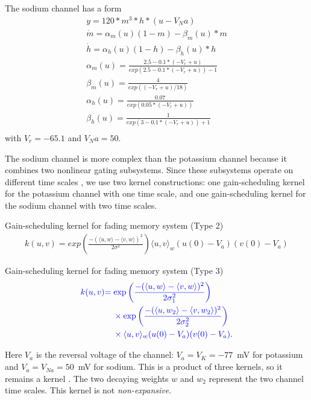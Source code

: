 The sodium channel has a form 
\begin{eqnarray}
y=120*m^3*h*(u-V_Na)\\
\dot{m}=\alpha_m(u)(1-m)-\beta_m(u)*m\\
\dot{h}=\alpha_h(u)(1-h)-\beta_h(u)*h\\
\alpha_m(u) = \frac{2.5 - 0.1*(-V_r+u)}{exp(2.5 - 0.1*(-V_r+u))- 1}\\
\beta_m(u) = \frac{4}{exp((-V_r+u)/18)}\\
\alpha_h(u) = \frac{0.07}{exp(0.05*(-V_r+u))}\\
\beta_h(u) = \frac{1}{exp(3 - 0.1*(-V_r+u))+ 1}\\
\end{eqnarray}
with $V_r= -65.1$ and $ V_Na= 50$. 

The sodium channel is more complex than the potassium channel because it combines two nonlinear gating subsystems. Since these subsystems operate on different time scales \cite{hodgkin_quantitative_1952}, we use two kernel constructions: one gain-scheduling kernel for the potassium channel with one time scale, and one gain-scheduling kernel for the sodium channel with two time scales.

\begin{definition}{Gain-scheduling kernel for fading memory system (Type 2)}
\begin{eqnarray}
  k(u,v)=exp\left(\frac{-(\langle u,w\rangle-\langle v,w\rangle)^2}{2\sigma^2}\right)\langle u,v\rangle_{w}(u(0)-V_{a})(v(0)-V_{a}) 
\end{eqnarray}
\end{definition}

\begin{definition}{Gain-scheduling kernel for fading memory system (Type 3)}
\begin{equation}
\begin{aligned}
  \textcolor{examineredit}{k(u,v)} &\textcolor{examineredit}{=\exp\left(\frac{-(\langle u,w\rangle-\langle v,w\rangle)^2}{2\sigma_1^2}\right)}\\
  &\textcolor{examineredit}{\quad{}\times\exp\left(\frac{-(\langle u,w_2\rangle-\langle v,w_2\rangle)^2}{2\sigma_2^2}\right)}\\
  &\textcolor{examineredit}{\quad{}\times\langle u,v\rangle_{w}(u(0)-V_{a})(v(0)-V_{a}).}
\end{aligned}
\end{equation}
\end{definition}

Here \(V_a\) is the reversal voltage of the channel: \(V_a=V_K=-77\)~mV for potassium and \(V_a=V_{Na}=50\)~mV for sodium. This is a product of three kernels, so it remains a kernel \cite{paulsen_introduction_2016}. The two decaying weights \(w\) and \(w_2\) represent the two channel time scales. This kernel is not \emph{non-expansive}.

